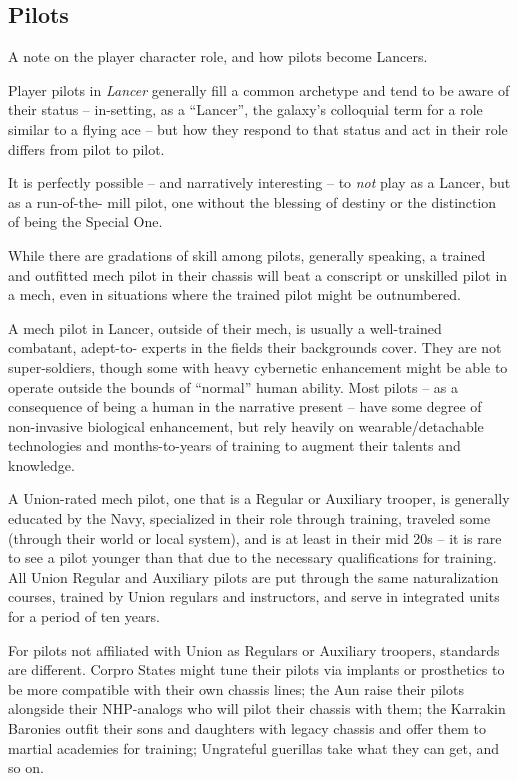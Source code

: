 \subsection{Pilots}

A note on the player character role, and how pilots become Lancers.

Player pilots in \textit{Lancer} generally fill a common archetype and tend to be aware of their status --
in-setting, as a “Lancer”, the galaxy’s colloquial term for a role similar to a flying ace --  but how
they respond to that status and act in their role differs from pilot to pilot.

It is perfectly possible -- and narratively interesting -- to \textit{not} play as a Lancer, but as a run-of-the-
mill pilot, one without the blessing of destiny or the distinction of being the Special One.

While there are gradations of skill among pilots, generally speaking, a trained and outfitted mech
pilot in their chassis will beat a conscript or unskilled pilot in a mech, even in situations where the
trained pilot might be outnumbered.

A mech pilot in Lancer, outside of their mech, is usually a well-trained combatant, adept-to-
experts in the fields their backgrounds cover. They are not super-soldiers, though some with
heavy cybernetic enhancement might be able to operate outside the bounds of “normal” human
ability. Most pilots -- as a consequence of being a human in the narrative present -- have some
degree of non-invasive biological enhancement, but rely heavily on wearable/detachable
technologies and months-to-years of training to augment their talents and knowledge.

A Union-rated mech pilot, one that is a Regular or Auxiliary trooper, is generally educated by the
Navy, specialized in their role through training, traveled some (through their world or local
system), and is at least in their mid 20s -- it is rare to see a pilot younger than that due to the
necessary qualifications for training. All Union Regular and Auxiliary pilots are put through the
same naturalization courses, trained by Union regulars and instructors, and serve in integrated
units for a period of ten years.

For pilots not affiliated with Union as Regulars or Auxiliary troopers, standards are different.
Corpro States might tune their pilots via implants or prosthetics to be more compatible with their
own chassis lines; the Aun raise their pilots alongside their NHP-analogs who will pilot their
chassis with them; the Karrakin Baronies outfit their sons and daughters with legacy chassis and
offer them to martial academies for training; Ungrateful guerillas take what they can get, and so
on.

